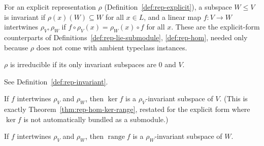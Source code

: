 \begin{definition}
  \label{def:rep-invariant}
  \leanok
  For an explicit representation $\rho$ (Definition~\ref{def:rep-explicit}),
  a subspace $W \le V$ is invariant if $\rho(x)(W)\subseteq W$ for all
  $x \in L$, and a linear map $f\colon V\to W$ intertwines $\rho_V,\rho_W$ if
  $f\circ\rho_V(x) = \rho_W(x)\circ f$ for all $x$. These are the explicit-form
  counterparts of Definitions~\ref{def:rep-lie-submodule},
  \ref{def:rep-hom}, needed only because $\rho$ does not come with ambient
  typeclass instances.
\end{definition}

\begin{definition}
  \label{def:rep-irreducible}
  \leanok
  $\rho$ is irreducible if its only invariant subspaces are $0$ and $V$.
\end{definition}

\begin{definition}
  \label{def:rep-intertwiner}
  \leanok
  See Definition~\ref{def:rep-invariant}.
\end{definition}

\begin{theorem}
  \label{thm:rep-ker-invariant}
  \leanok
  If $f$ intertwines $\rho_V$ and $\rho_W$, then $\ker f$ is a $\rho_V$-invariant
  subspace of $V$. (This is exactly Theorem~\ref{thm:rep-hom-ker-range}, restated
  for the explicit form where $\ker f$ is not automatically bundled as a
  submodule.)
\end{theorem}

\begin{theorem}
  \label{thm:rep-range-invariant}
  \leanok
  If $f$ intertwines $\rho_V$ and $\rho_W$, then $\operatorname{range} f$ is a
  $\rho_W$-invariant subspace of $W$.
\end{theorem}

